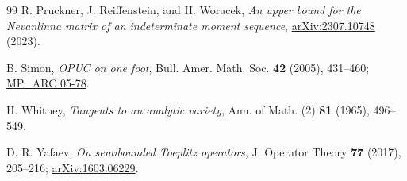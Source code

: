 \documentclass[11pt]{article}
\begin{document}
\begin{thebibliography}{99}
R. Pruckner, J. Reiffenstein, and H. Woracek,
\emph{An upper bound for the Nevanlinna matrix of an indeterminate moment sequence},
\href{https://arxiv.org/abs/2307.10748}{arXiv:2307.10748} (2023).

B. Simon,
\emph{OPUC on one foot},
Bull. Amer. Math. Soc. \textbf{42} (2005), 431--460;
\href{https://web.ma.utexas.edu/mp_arc/c/05/05-78.pdf}{MP\_ARC 05-78}.

H. Whitney,
\emph{Tangents to an analytic variety},
Ann. of Math. (2) \textbf{81} (1965), 496--549.

D. R. Yafaev,
\emph{On semibounded Toeplitz operators},
J. Operator Theory \textbf{77} (2017), 205--216;
\href{https://arxiv.org/abs/1603.06229}{arXiv:1603.06229}.

\end{thebibliography}
\end{document}
